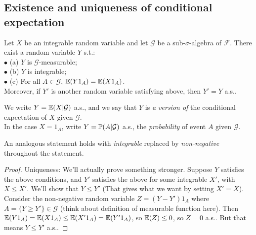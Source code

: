 \documentclass[a4paper]{article}
\begin{document}
\subsection{Existence and uniqueness of conditional expectation}
\begin{thm}
    Let $X$ be an integrable random variable and let $\mathcal{G}$ be a sub-$\sigma$-algebra of $\mathcal{F}$. There exist a random variable $Y$ s.t.:\\
    $\bullet$ (a) $Y$ is $\mathcal{G}$-measurable;\\
    $\bullet$ (b) $Y$ is integrable;\\
    $\bullet$ (c) For all $A \in \mathcal{G}$, $\E(Y1_A) = \E(X1_A)$.\\
    Moreover, if $Y'$ is another random variable satisfying above, then $Y'=Y$ a.s..

    We write $Y=\E(X|\mathcal{G})$ a.s., and we say that $Y$ is \emph{a version of} the conditional expectation of $X$ given $\mathcal{G}$.\\
    In the case $X=1_A$, write $Y=\P(A|\mathcal{G})$ a.s., the \emph{probability} of event $A$ given $\mathcal{G}$.

    An analogous statement holds with \emph{integrable} replaced by \emph{non-negative} throughout the statement.
    \begin{proof}
        Uniqueness: We'll actually prove something stronger. Suppose $Y$ satisfies the above conditions, and $Y'$ satisfies the above for some integrable $X'$, with $X \leq X'$. We'll show that $Y \leq Y'$ (That gives what we want by setting $X'=X$).\\
        Consider the non-negative random variable $Z=(Y-Y')1_A$ where $A =\{Y \geq Y' \} \in \mathcal{G}$ (think about definition of measurable function here). Then $\E(Y 1_A) = \E(X 1_A) \leq \E(X' 1_A) = \E(Y' 1_A)$, so $\E(Z) \leq 0$, so $Z = 0$ a.s.. But that means $Y\leq Y'$ a.s..


\end{proof}
\end{thm}
\end{document}
